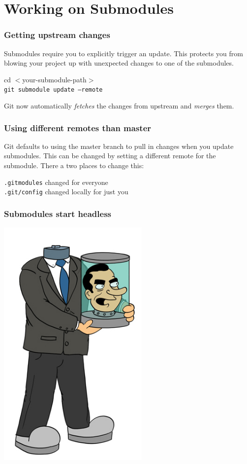 \section{Working on Submodules}

\begin{frame}[fragile]
  \frametitle{Getting upstream changes}
   Submodules require you to  \alert{explicitly} trigger an update.
   This protects you from blowing your project up with unexpected changes to one of the submodules.    
  \begin{center}cd $<$your-submodule-path$>$\\ \texttt{git submodule update --remote} \end{center}
  
  Git now automatically \emph{fetches} the changes from upstream and \emph{merges} them.

\end{frame}

\begin{frame}[fragile]
  \frametitle{Using different remotes than master}
  Git defaults to using the master branch to pull in changes when you update submodules.
  This can be changed by setting a different remote for the submodule. There a two places to change this:
\begin{center} 
  \texttt{.gitmodules} changed for everyone \\
  \texttt{.git/config} changed locally for just you
\end{center}
\end{frame}

\begin{frame}
\frametitle{Submodules start headless}
 \begin{center}
 \includegraphics[width=280px]{images/nixon.jpg}
 \end{center}
\end{frame}



